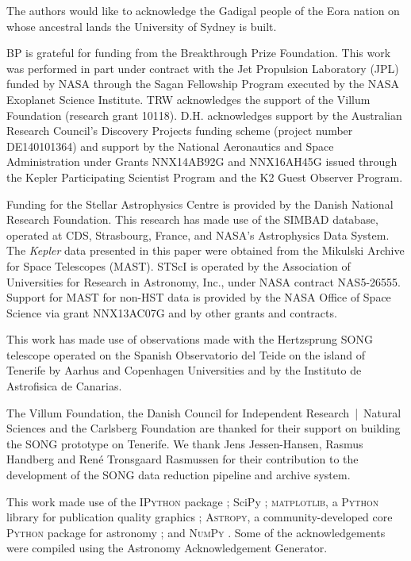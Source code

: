 \documentclass[modern]{aastex61}
\newcommand{\kepler}{\emph{Kepler}\xspace}
\begin{document}
The authors would like to acknowledge the Gadigal people of the Eora nation on whose ancestral lands the University of Sydney is built.

BP is grateful for funding from the Breakthrough Prize Foundation. This work was performed in part under contract with the Jet Propulsion Laboratory (JPL) funded by NASA through the Sagan Fellowship Program executed by the NASA Exoplanet Science Institute.
TRW acknowledges the support of the Villum Foundation (research grant 10118).
D.H. acknowledges support by the Australian Research Council's Discovery Projects funding scheme (project number DE140101364) and support by the National Aeronautics and Space Administration under Grants NNX14AB92G and NNX16AH45G issued through the Kepler Participating Scientist Program and the K2 Guest Observer Program.

Funding for the Stellar Astrophysics Centre is provided by the Danish National Research Foundation. 
This research has made use of the SIMBAD database, operated at CDS, Strasbourg, France, and NASA's Astrophysics Data System. The \kepler data presented in this paper were obtained from the Mikulski Archive for Space Telescopes (MAST). STScI is operated by the Association of Universities for Research in Astronomy, Inc., under NASA contract NAS5-26555. Support for MAST for non-HST data is provided by the NASA Office of Space Science via grant NNX13AC07G and by other grants and contracts.

This work has made use of observations made with the Hertzsprung SONG telescope operated on the Spanish Observatorio
  del Teide on the island of Tenerife by Aarhus and Copenhagen Universities and by the Instituto de
  Astrofisica de Canarias.

The Villum Foundation, the Danish Council for Independent Research~|~Natural Sciences and
 the Carlsberg Foundation are thanked for their support on building the SONG prototype on
 Tenerife.
 We thank Jens Jessen-Hansen, Rasmus Handberg and René Tronsgaard Rasmussen for their contribution
 to the development of the SONG data reduction pipeline and archive system.



This work made use of the \textsc{IPython} package \citep{PER-GRA:2007}; SciPy \citep{scipy};  \textsc{matplotlib}, a \textsc{Python} library for publication quality graphics \citep{Hunter:2007}; \textsc{Astropy}, a community-developed core \textsc{Python} package for astronomy \citep{2013A&A...558A..33A}; and \textsc{NumPy} \citep{van2011numpy}. Some of the acknowledgements were compiled using the Astronomy Acknowledgement Generator.
\end{document}
